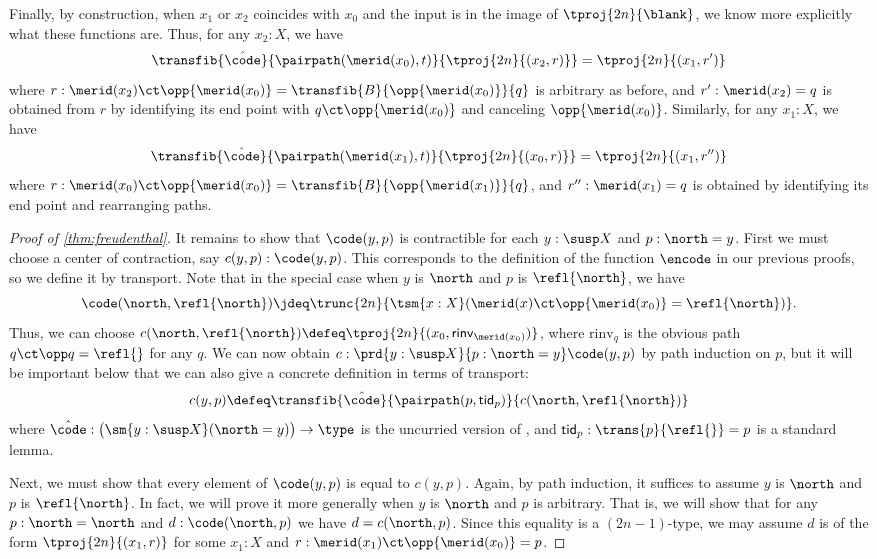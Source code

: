 {Finally, by construction, when $x_1$ or $x_2$ coincides with $x_0$ and the input is in the image of $\tproj{2n}{\blank}$, we know more explicitly what these functions are.
Thus, for any $x_2:X$, we have
\begin{equation}
  \transfib{\hat{\code}}{\pairpath(\merid(x_0),t)}{\tproj{2n}{(x_2,r)}}
  =\tproj{2n}{(x_1,r')}\label{eq:freudcompute1}
\end{equation}
where $r:\merid(x_2) \ct \opp{\merid(x_0)} = \transfib{B}{\opp{\merid(x_0)}}{q}$ is arbitrary as before, and $r':\merid(x_2)=q$ is obtained from $r$ by identifying its end point with $q \ct \opp{\merid(x_0)}$ and canceling $\opp{\merid(x_0)}$.
Similarly, for any $x_1:X$, we have
\begin{equation}
  \transfib{\hat{\code}}{\pairpath(\merid(x_1),t)}{\tproj{2n}{(x_0,r)}}
  = \tproj{2n}{(x_1,r'')}\label{eq:freudcompute2}
\end{equation}
where $r:\merid(x_0) \ct \opp{\merid(x_0)} = \transfib{B}{\opp{\merid(x_1)}}{q}$, and $r'':\merid(x_1)=q$ is obtained by identifying its end point and rearranging paths.

\begin{proof}[Proof of \cref{thm:freudenthal}]
  It remains to show that $\code(y,p)$ is contractible for each $y:\susp X$ and $p:\north=y$.
  First we must choose a center of contraction, say $c(y,p):\code(y,p)$.
  This corresponds to the definition of the function $\encode$ in our previous proofs, so we define it by transport.
  Note that in the special case when $y$ is $\north$ and $p$ is $\refl{\north}$, we have
  \[\code(\north,\refl{\north}) \jdeq \trunc{2n}{\tsm{x:X} (\merid(x) \ct \opp{\merid(x_0)} = \refl{\north})}.\]
  Thus, we can choose $c(\north,\refl{\north})\defeq \tproj{2n}{(x_0,\mathsf{rinv}_{\merid(x_0)})}$, where $\mathrm{rinv}_q$ is the obvious path $q\ct\opp q = \refl{}$ for any $q$.
  We can now obtain $c:\prd{y:\susp X}{p:\north=y} \code(y,p)$ by path induction on $p$, but it will be important below that we can also give a concrete definition in terms of transport:
  \[ c(y,p) \defeq \transfib{\hat{\code}}{\pairpath(p,\mathsf{tid}_p)}{c(\north,\refl{\north})}
  \]
  where $\hat{\code}: \big(\sm{y:\susp X} (\north=y)\big) \to \type$ is the uncurried version of \code, and $\mathsf{tid}_p:\trans{p}{\refl{}} = p$ is a standard lemma.

  Next, we must show that every element of $\code(y,p)$ is equal to $c(y,p)$.
  Again, by path induction, it suffices to assume $y$ is $\north$ and $p$ is $\refl{\north}$.
  In fact, we will prove it more generally when $y$ is $\north$ and $p$ is arbitrary.
  That is, we will show that for any $p:\north=\north$ and $d:\code(\north,p)$ we have $d = c(\north,p)$.
  Since this equality is a $(2n-1)$-type, we may assume $d$ is of the form $\tproj{2n}{(x_1,r)}$ for some $x_1:X$ and $r:\merid(x_1) \ct \opp{\merid(x_0)} = p$.


\end{proof}}
